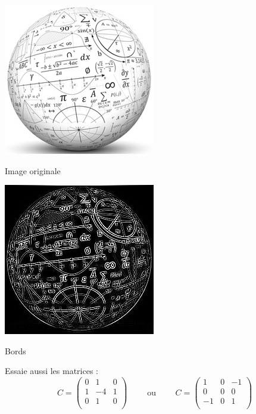 \documentclass[11pt,class=report,crop=false]{standalone}
\begin{document}
\begin{activite}
\begin{center}
	\begin{minipage}{0.45\textwidth}\center
		\includegraphics[scale=\myscale,scale=0.5]{png/monde}
		
		Image originale
	\end{minipage}
	\begin{minipage}{0.45\textwidth}\center
		\includegraphics[scale=\myscale,scale=0.5]{png/monde_conv_bord}
		
		Bords
	\end{minipage}	
\end{center}

Essaie aussi les matrices : 
$$C = 
\begin{pmatrix}
0&1&0\\
1&-4&1\\
0&1&0\\
\end{pmatrix} \qquad \text{ ou } \qquad
C = \begin{pmatrix}
1&0&-1\\
0&0&0\\
-1&0&1\\
\end{pmatrix}$$


\bigskip


\end{activite}
\end{document}

